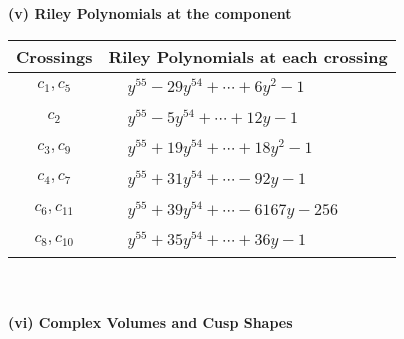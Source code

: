 \documentclass[1p]{elsarticle_modified}
\theoremstyle{definition}
\begin{document}
\newpage\renewcommand{\arraystretch}{1}
\flushleft \textbf{(v) Riley Polynomials at the component}\newline \\
\begin{tabular}{m{50pt}|m{274pt}}
Crossings & \hspace{64pt}Riley Polynomials at each crossing \\
\hline $$\begin{aligned}c_{1},c_{5}\end{aligned}$$&$\begin{aligned}
&y^{55}-29 y^{54}+\cdots+6 y^2-1
\end{aligned}$\\
\hline $$\begin{aligned}c_{2}\end{aligned}$$&$\begin{aligned}
&y^{55}-5 y^{54}+\cdots+12 y-1
\end{aligned}$\\
\hline $$\begin{aligned}c_{3},c_{9}\end{aligned}$$&$\begin{aligned}
&y^{55}+19 y^{54}+\cdots+18 y^2-1
\end{aligned}$\\
\hline $$\begin{aligned}c_{4},c_{7}\end{aligned}$$&$\begin{aligned}
&y^{55}+31 y^{54}+\cdots-92 y-1
\end{aligned}$\\
\hline $$\begin{aligned}c_{6},c_{11}\end{aligned}$$&$\begin{aligned}
&y^{55}+39 y^{54}+\cdots-6167 y-256
\end{aligned}$\\
\hline $$\begin{aligned}c_{8},c_{10}\end{aligned}$$&$\begin{aligned}
&y^{55}+35 y^{54}+\cdots+36 y-1
\end{aligned}$\\
\hline
\end{tabular}\\~\\
\newpage\flushleft \textbf{(vi) Complex Volumes and Cusp Shapes}
\end{document}
